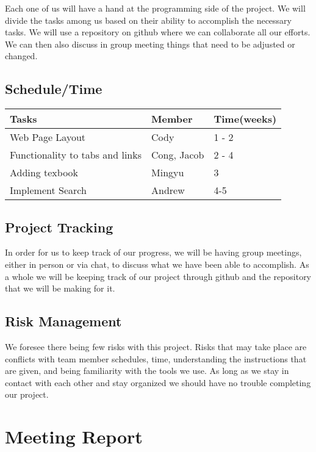 \documentclass[12pt]{article}
\begin{document}
	\quad Each one of us will have a hand at the programming side of the project. We will divide the tasks among us based on their ability to accomplish the necessary tasks. We will use a repository on github where we can collaborate all our efforts. We can then also discuss in group meeting things that need to be adjusted or changed. 

		\subsection{Schedule/Time}
		
		\begin{tabular}{ | l | l | l | }
		\hline
		Tasks & Member & Time(weeks) \\ \hline
		Web Page Layout & Cody  & 1 - 2	\\ \hline
		Functionality to tabs and links & Cong, Jacob & 2 - 4 \\ \hline
		Adding texbook & Mingyu & 3 \\ \hline
		Implement Search & Andrew & 4-5 \\	

		\hline
		\end{tabular}

		

		\subsection{Project Tracking}

\quad In order for us to keep track of our progress, we will be having group meetings, either in person or via chat, to discuss what we have been able to accomplish. As a whole we will be keeping track of our project through github and the repository that we will be making for it.

		\subsection{Risk Management}
\quad We foresee there being few risks with this project. Risks that may take place are conflicts with team member schedules, time, understanding the instructions that are given, and being familiarity with the tools we use. As long as we stay in contact with each other and stay organized we should have no trouble completing our project. 



	\section{Meeting Report}
\end{document}
